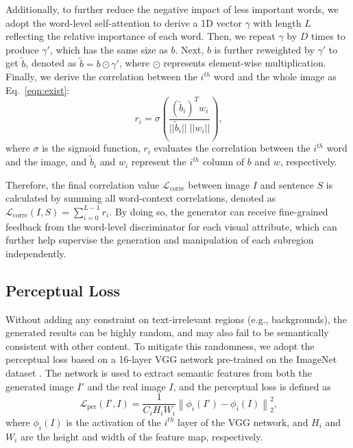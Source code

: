\documentclass{article}
\begin{document}
Additionally, to further reduce the negative impact of less important words, we adopt the word-level self-attention \cite{nam2018text} to derive a 1D vector $\gamma$ with length $L$ reflecting the relative importance of each word. 
Then, we repeat $\gamma$ by $D$ times to produce ${\gamma}'$, which {has} the same size as $b$.
Next, $b$ is further reweighted by $\gamma'$ to get $\tilde{b}$, denoted as $\tilde{b} = {b}\odot {\gamma}'$, where $\odot$ represents element-wise multiplication.
Finally, we derive the correlation between the $i^{th}$ word and the whole image as Eq.~\eqref{eqn:exist}:
\begin{equation}
r_{i}=\sigma (\frac{(\tilde{b}_i)^{T}w_{i}}{||\tilde{b}_{i}  ||\;|| w_{i} ||})
\textrm{,}
\label{eqn:exist}
\end{equation}
where $\sigma$ is the sigmoid function, $r_i$ evaluates the correlation between the $i^{th}$ word and the image, and $\tilde{b}_i$ and $w_{i}$ represent the $i^{th}$ column of $b$ and $w$, respectively.

Therefore, the final correlation value $\mathcal{L}_\text{corre}$ between image $I$ and sentence $S$ is calculated by summing all word-context correlations, denoted as $\mathcal{L}_\text{corre}(I,S)=\sum ^{L-1}_{i=0}r_{i}$.
By doing so, the generator can receive fine-grained feedback from the word-level discriminator for each visual attribute, which can further help supervise the generation and manipulation of each subregion independently.

\subsection{Perceptual Loss}
\label{sec:semantic}
Without {adding} any constraint on text-irrelevant regions (e.g., backgrounds), the generated results can be highly random, and may also fail to be semantically consistent with other content. 
To mitigate this randomness, we adopt the perceptual loss \cite{johnson2016perceptual} based on a 16-layer VGG network \cite{simonyan2014very} pre-trained on the ImageNet dataset \cite{russakovsky2015imagenet}. 
The network is used to extract semantic features from both the generated image ${I}'$ and the real image $I$, and the  perceptual loss is defined as
\begin{equation}
\mathcal{L}_\text{per}({I'},I)=\frac{1}{C_{i}H_{i}W_{i}} \left \| \phi_{i}({I'})-\phi_{i}(I) \right \|^2_2
\textrm{,}
\end{equation}
where $\phi_{i}(I)$ is the activation of the $i^{th}$ layer of the VGG network, and $H_i$ and $W_i$ are the height and width of the feature map, respectively.
\end{document}
